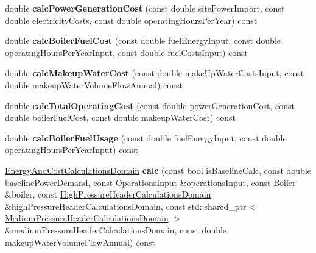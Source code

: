 \begin{DoxyCompactItemize}
double {\bfseries calc\+Power\+Generation\+Cost} (const double site\+Power\+Import, const double electricity\+Costs, const double operating\+Hours\+Per\+Year) const
\item 
\mbox{\label{class_energy_and_cost_calculator_aa5a5f91e9ed5dab198eda79fc5b18d53}} 
double {\bfseries calc\+Boiler\+Fuel\+Cost} (const double fuel\+Energy\+Input, const double operating\+Hours\+Per\+Year\+Input, const double fuel\+Costs\+Input) const
\item 
\mbox{\label{class_energy_and_cost_calculator_a5d919bd8a35b867cd3c1cd356906c77c}} 
double {\bfseries calc\+Makeup\+Water\+Cost} (const double make\+Up\+Water\+Costs\+Input, const double makeup\+Water\+Volume\+Flow\+Annual) const
\item 
\mbox{\label{class_energy_and_cost_calculator_aa9148a6587edea63d784dba51cbfca9b}} 
double {\bfseries calc\+Total\+Operating\+Cost} (const double power\+Generation\+Cost, const double boiler\+Fuel\+Cost, const double makeup\+Water\+Cost) const
\item 
\mbox{\label{class_energy_and_cost_calculator_a24bf5affb772d9db90af9f95cf737f17}} 
double {\bfseries calc\+Boiler\+Fuel\+Usage} (const double fuel\+Energy\+Input, const double operating\+Hours\+Per\+Year\+Input) const
\item 
\mbox{\label{class_energy_and_cost_calculator_aa301f421bf405bd8a75ac190bb4cad3d}} 
\hyperlink{class_energy_and_cost_calculations_domain}{Energy\+And\+Cost\+Calculations\+Domain} {\bfseries calc} (const bool is\+Baseline\+Calc, const double baseline\+Power\+Demand, const \hyperlink{class_operations_input}{Operations\+Input} \&operations\+Input, const \hyperlink{class_boiler}{Boiler} \&boiler, const \hyperlink{class_high_pressure_header_calculations_domain}{High\+Pressure\+Header\+Calculations\+Domain} \&high\+Pressure\+Header\+Calculations\+Domain, const std\+::shared\+\_\+ptr$<$ \hyperlink{class_medium_pressure_header_calculations_domain}{Medium\+Pressure\+Header\+Calculations\+Domain} $>$ \&medium\+Pressure\+Header\+Calculations\+Domain, const double makeup\+Water\+Volume\+Flow\+Annual) const
\item 
\mbox{\label{class_energy_and_cost_calculator_a25f512a60f88cc36af0fc0978d841c8a}} 

\end{DoxyCompactItemize}
